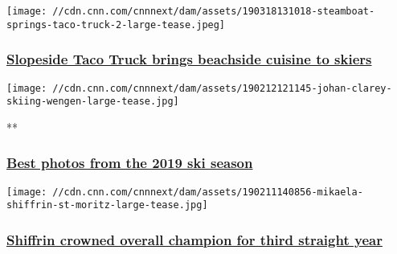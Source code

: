 \href{/travel/article/taco-beast-steamboat-springs-colorado/index.html}{}

\texttt{[image: //cdn.cnn.com/cnnnext/dam/assets/190318131018-steamboat-springs-taco-truck-2-large-tease.jpeg]}

\hypertarget{slopeside-taco-truck-brings-beachside-cuisine-to-skiers}{%
\subsubsection{\texorpdfstring{\href{/travel/article/taco-beast-steamboat-springs-colorado/index.html}{Slopeside
Taco Truck brings beachside cuisine to
skiers}}{Slopeside Taco Truck brings beachside cuisine to skiers}}\label{slopeside-taco-truck-brings-beachside-cuisine-to-skiers}}

\href{/2019/02/12/sport/gallery/best-photos-from-the-2019-fis-world-cup-ski-season-spt-intl/index.html}{}

\texttt{[image: //cdn.cnn.com/cnnnext/dam/assets/190212121145-johan-clarey-skiing-wengen-large-tease.jpg]}

**

\hypertarget{best-photos-from-the-2019-ski-season}{%
\subsubsection{\texorpdfstring{\href{/2019/02/12/sport/gallery/best-photos-from-the-2019-fis-world-cup-ski-season-spt-intl/index.html}{Best
photos from the 2019 ski
season}}{Best photos from the 2019 ski season}}\label{best-photos-from-the-2019-ski-season}}

\href{/2019/03/03/sport/skiing-shiffrin-world-cup-overall-spt-intl/index.html}{}

\texttt{[image: //cdn.cnn.com/cnnnext/dam/assets/190211140856-mikaela-shiffrin-st-moritz-large-tease.jpg]}

\hypertarget{shiffrin-crowned-overall-champion-for-third-straight-year}{%
\subsubsection{\texorpdfstring{\href{/2019/03/03/sport/skiing-shiffrin-world-cup-overall-spt-intl/index.html}{Shiffrin
crowned overall champion for third straight
year}}{Shiffrin crowned overall champion for third straight year}}\label{shiffrin-crowned-overall-champion-for-third-straight-year}}

\href{/2019/02/18/sport/laureus-world-sports-awards-lindsey-vonn-simone-biles-novak-djokovic-spt-intl/index.html}{}

